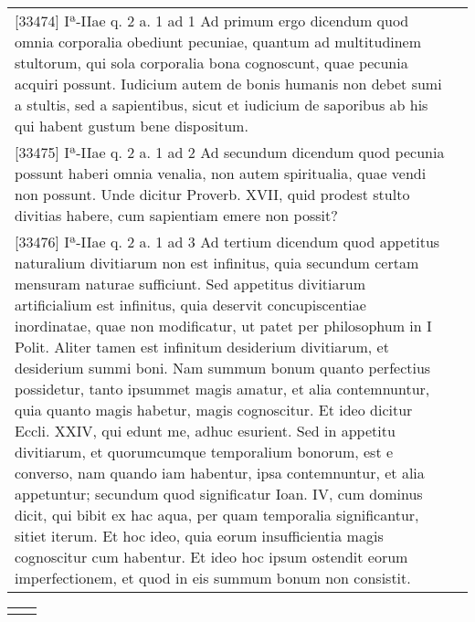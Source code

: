 \documentclass[10pt]{jsarticle} %
\begin{document}
\begin{longtable}{p{21em}p{21em}}
[33474] Iª-IIae q. 2 a. 1 ad 1 Ad primum ergo dicendum quod omnia
 corporalia obediunt pecuniae, quantum ad multitudinem stultorum, qui
 sola corporalia bona cognoscunt, quae pecunia acquiri possunt. Iudicium
 autem de bonis humanis non debet sumi a stultis, sed a sapientibus,
 sicut et iudicium de saporibus ab his qui habent gustum bene
 dispositum.

 
&


\\




[33475] Iª-IIae q. 2 a. 1 ad 2 Ad secundum dicendum quod pecunia possunt
 haberi omnia venalia, non autem spiritualia, quae vendi non
 possunt. Unde dicitur Proverb. XVII, quid prodest stulto divitias
 habere, cum sapientiam emere non possit?
 
&


\\




[33476] Iª-IIae q. 2 a. 1 ad 3 Ad tertium dicendum quod appetitus
 naturalium divitiarum non est infinitus, quia secundum certam mensuram
 naturae sufficiunt. Sed appetitus divitiarum artificialium est
 infinitus, quia deservit concupiscentiae inordinatae, quae non
 modificatur, ut patet per philosophum in I Polit. Aliter tamen est
 infinitum desiderium divitiarum, et desiderium summi boni. Nam summum
 bonum quanto perfectius possidetur, tanto ipsummet magis amatur, et
 alia contemnuntur, quia quanto magis habetur, magis cognoscitur. Et
 ideo dicitur Eccli. XXIV, qui edunt me, adhuc esurient. Sed in appetitu
 divitiarum, et quorumcumque temporalium bonorum, est e converso, nam
 quando iam habentur, ipsa contemnuntur, et alia appetuntur; secundum
 quod significatur Ioan. IV, cum dominus dicit, qui bibit ex hac aqua,
 per quam temporalia significantur, sitiet iterum. Et hoc ideo, quia
 eorum insufficientia magis cognoscitur cum habentur. Et ideo hoc ipsum
 ostendit eorum imperfectionem, et quod in eis summum bonum non
 consistit.
 
&



\end{longtable}


\newpage


\begin{longtable}{p{21em}p{21em}}


&

\end{longtable}
\end{document}
